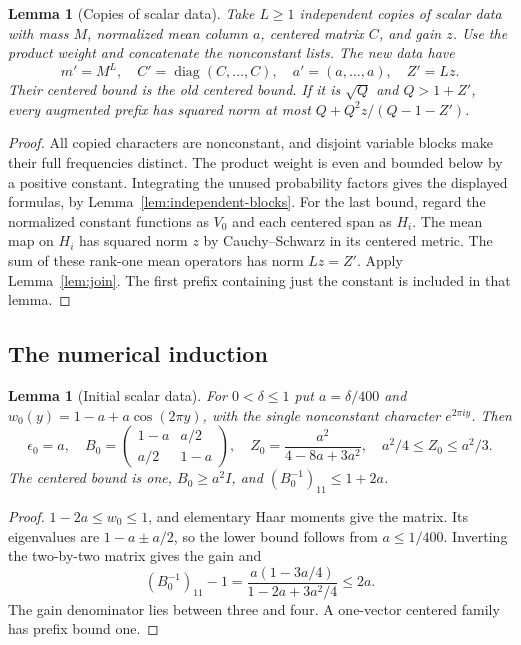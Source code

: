 \documentclass[reqno,a4paper,12pt]{amsart}
\newtheorem{lemma}[theorem]{Lemma}
\theoremstyle{definition}
\newcommand{\diag}{\operatorname{diag}}
\begin{document}
\begin{lemma}[Copies of scalar data]\label{lem:scalar-copies}
Take $L\ge1$ independent copies of scalar data with mass $M$,
normalized mean column $a$, centered matrix $C$, and gain $z$.
Use the product weight and concatenate the nonconstant lists.
The new data have
\[
 m'=M^L,\quad C'=\diag(C,\ldots,C),\quad
 a'=(a,\ldots,a),\quad Z'=Lz.
\]
Their centered bound is the old centered bound. If it is $\sqrt Q$
and $Q>1+Z'$, every augmented prefix has squared norm at most
$Q+Q^2z/(Q-1-Z')$.
\end{lemma}
\begin{proof}
All copied characters are nonconstant, and disjoint variable blocks
make their full frequencies distinct. The product weight is even and
bounded below by a positive constant. Integrating the unused
probability factors gives the displayed formulas, by
Lemma~\ref{lem:independent-blocks}.
For the last bound, regard the normalized constant functions as
$V_0$ and each centered span as $H_i$. The mean map on $H_i$ has
squared norm $z$ by Cauchy--Schwarz in its centered metric.
The sum of these rank-one mean operators has norm $Lz=Z'$.
Apply Lemma~\ref{lem:join}. The first prefix containing just the
constant is included in that lemma.
\end{proof}

\subsection{The numerical induction}
\begin{lemma}[Initial scalar data]\label{lem:scalar-initial}
For $0<\delta\le1$ put $a=\delta/400$ and
$w_0(y)=1-a+a\cos(2\pi y)$, with the single nonconstant character
$e^{2\pi iy}$. Then
\[
 \epsilon_0=a,\quad B_0=\begin{pmatrix}1-a&a/2\\a/2&1-a\end{pmatrix},
 \quad Z_0=\frac{a^2}{4-8a+3a^2},\quad
 a^2/4\le Z_0\le a^2/3.
\]
The centered bound is one,
$B_0\ge a^2I$, and $(B_0^{-1})_{11}\le1+2a$.
\end{lemma}
\begin{proof}
$1-2a\le w_0\le1$, and elementary Haar moments give the matrix.
Its eigenvalues are $1-a\pm a/2$, so the lower bound follows from
$a\le1/400$. Inverting the two-by-two matrix gives the gain and
\[
 (B_0^{-1})_{11}-1
 =\frac{a(1-3a/4)}{1-2a+3a^2/4}\le2a.
\]
The gain denominator lies between three and four.
A one-vector centered family has prefix bound one.
\end{proof}
\end{document}
